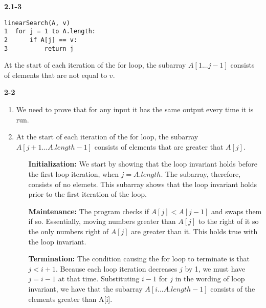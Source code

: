 \documentclass[a4paper]{article}
\begin{document}
    \vspace{0.75cm}

    \textbf{2.1-3}
    \begin{verbatim}
linearSearch(A, v)
1  for j = 1 to A.length:
2      if A[j] == v:
3          return j
    \end{verbatim}

    At the start of each iteration of the for loop, the subarray $A[1...j-1]$
    consists of elements that are not equal to $v$.\\

    \newpage

    \textbf{2-2}

    \begin{enumerate}[label=\alph*)]
        \item We need to prove that for any input it has the same output every time it is run.
        
        \item At the start of each iteration of the for loop, the subarray 
        $A[j+1...A.length-1]$ consists of elements that are greater that $A[j]$.

        \begin{itemize}[itemindent=5em]

            \item[\textbf{Initialization:}] We start by showing that the loop invariant 
            holds before the first loop iteration, when $j = A.length$. The subarray, 
            therefore, consists of no elemets. This subarray shows that the loop invariant 
            holds prior to the first iteration of the loop.

            \item[\textbf{Maintenance:}] 
            The program checks if $A[j] < A[j-1]$ and swaps them if so. Essentially, moving 
            numbers greater than $A[j]$ to the right of it so the only numbers right of 
            $A[j]$ are greater than it. This holds true with the loop invariant.
            
            \item[\textbf{Termination:}] 
            The condition causing the for loop to terminate is that $j < i+1$. Because
            each loop iteration decreases $j$ by 1, we must have $j = i - 1$ at that time.
            Substituting $i - 1$ for $j$ in the wording of loop invariant, we have that the
            subarray $A[i...A.length-1]$ consists of the elements greater than A[i]. 
            

\end{itemize}
\end{enumerate}
\end{document}
